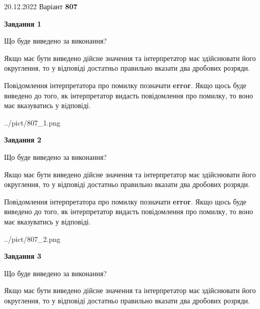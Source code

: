 \documentclass[12pt, ukrainian]{article}
\begin{document}
{20.12.2022 Варіант \No \textbf { 807 }\par}
{
\begin {Large}

{\begin {center}\textbf{Завдання 1}\end {center}}\par
Що буде виведено за виконання? \par

Якщо має бути виведено дійсне значення та інтерпретатор має здійснювати його округлення, 
то у відповіді достатньо правильно вказати два дробових розряди.

Повідомлення інтерпретатора про помилку позначати \textbf{error}.
Якщо щось буде виведено до того, як інтерпретатор видасть повідомлення про помилку, 
то воно має вказуватись у відповіді. \par

\begin{center}
	{../pict/807_1.png}
\end{center}
\newpage

{\begin {center}\textbf{Завдання 2}\end {center}}\par
Що буде виведено за виконання? \par

Якщо має бути виведено дійсне значення та інтерпретатор має здійснювати його округлення, 
то у відповіді достатньо правильно вказати два дробових розряди.

Повідомлення інтерпретатора про помилку позначати \textbf{error}.
Якщо щось буде виведено до того, як інтерпретатор видасть повідомлення про помилку, 
то воно має вказуватись у відповіді. \par

\begin{center}
	{../pict/807_2.png}
\end{center}
\newpage

{\begin {center}\textbf{Завдання 3}\end {center}}\par
Що буде виведено за виконання? \par

Якщо має бути виведено дійсне значення та інтерпретатор має здійснювати його округлення, 
то у відповіді достатньо правильно вказати два дробових розряди.


\end{Large}}
\end{document}
